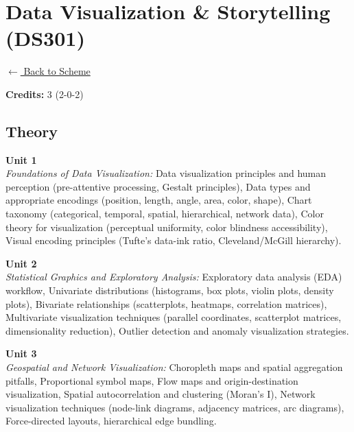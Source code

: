 \section*{Data Visualization \& Storytelling (DS301)}
\label{major:DS_3}

\noindent \small{\hyperref[main:scheme]{$\leftarrow$ Back to Scheme}} \vspace{0.5cm}

\noindent \textbf{Credits:} 3 (2-0-2)

\subsection*{Theory}
\noindent\textbf{Unit 1} \\
\textit{Foundations of Data Visualization:} Data visualization principles and human perception (pre-attentive processing, Gestalt principles), Data types and appropriate encodings (position, length, angle, area, color, shape), Chart taxonomy (categorical, temporal, spatial, hierarchical, network data), Color theory for visualization (perceptual uniformity, color blindness accessibility), Visual encoding principles (Tufte's data-ink ratio, Cleveland/McGill hierarchy).

\vspace{0.3cm}

\noindent\textbf{Unit 2} \\
\textit{Statistical Graphics and Exploratory Analysis:} Exploratory data analysis (EDA) workflow, Univariate distributions (histograms, box plots, violin plots, density plots), Bivariate relationships (scatterplots, heatmaps, correlation matrices), Multivariate visualization techniques (parallel coordinates, scatterplot matrices, dimensionality reduction), Outlier detection and anomaly visualization strategies.

\vspace{0.3cm}

\noindent\textbf{Unit 3} \\
\textit{Geospatial and Network Visualization:} Choropleth maps and spatial aggregation pitfalls, Proportional symbol maps, Flow maps and origin-destination visualization, Spatial autocorrelation and clustering (Moran's I), Network visualization techniques (node-link diagrams, adjacency matrices, arc diagrams), Force-directed layouts, hierarchical edge bundling.

\vspace{0.3cm}

